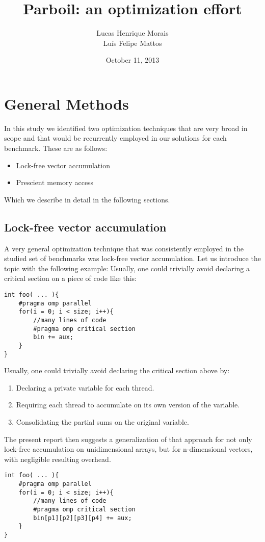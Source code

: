 \documentclass[10pt,a4paper]{report}
\author{Lucas Henrique Morais\\ Luís Felipe Mattos}
\title{\textbf{Parboil:} an optimization effort}
\date{October 11, 2013}
\begin{document}
\maketitle

	\tableofcontents

\chapter{General Methods}

In this study we identified two optimization techniques that are very broad in scope and that would be recurrently employed in our solutions for each benchmark. These are as follows:
\begin{itemize}
\item Lock-free vector accumulation
\item Prescient memory access
\end{itemize}

Which we describe in detail in the following sections.
\section{Lock-free vector accumulation}
A very general optimization technique that was consistently employed in the studied set of benchmarks was lock-free vector accumulation. Let us introduce the topic with the following example:
Usually, one could trivially avoid declaring a critical section on a piece of code like this:
	     
\begin{lstlisting}[caption=0-dimensional accumulation,style=base]
int foo( ... ){
	#pragma omp parallel
	for(i = 0; i < size; i++){
		//many lines of code
		#pragma omp critical section
		bin += aux;
	}
}
\end{lstlisting}	     
	     
Usually, one could trivially avoid declaring the critical section above by:
\begin{enumerate}
\item Declaring a private variable for each thread.
\item Requiring each thread to accumulate on its own version of the variable.
\item Consolidating the partial sums on the original variable.
\end{enumerate}
	  
The present report then suggests a generalization of that approach for not only lock-free accumulation on unidimensional arrays, but for n-dimensional vectors, with negligible resulting overhead.
\newpage
\begin{lstlisting}[caption=4-dimensional accumulation,style=base]
int foo( ... ){
	#pragma omp parallel
	for(i = 0; i < size; i++){
		//many lines of code
		#pragma omp critical section
		bin[p1][p2][p3][p4] += aux;
	}
}
\end{lstlisting}	     
	     
\end{document}
